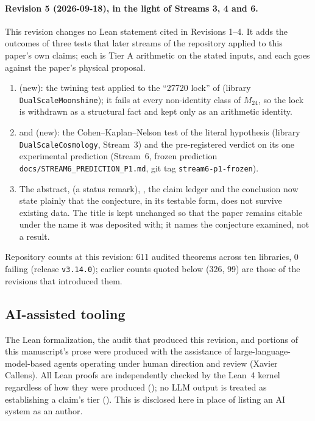 \documentclass[11pt,a4paper]{article}
\theoremstyle{remark}
\begin{document}
\paragraph{Revision 5 (2026-09-18), in the light of Streams 3, 4 and 6.} This revision changes no Lean
statement cited in Revisions 1--4. It adds the outcomes of three tests that later streams of the
repository applied to this paper's own claims; each is Tier A arithmetic on the stated inputs, and
each goes against the paper's physical proposal.
\begin{enumerate}
  \item {} (new): the twining test applied to the ``27720 lock'' of
     (library \texttt{DualScaleMoonshine}); it fails at every non-identity class of
    $M_{24}$, so the lock is withdrawn as a structural fact and kept only as an arithmetic identity.
  \item {} and  (new): the Cohen--Kaplan--Nelson test of the
    literal hypothesis (library \texttt{DualScaleCosmology}, Stream~3) and the pre-registered verdict on
    its one experimental prediction (Stream~6, frozen prediction
    \texttt{docs/\discretionary{}{}{}STREAM6\_\discretionary{}{}{}PREDICTION\_\discretionary{}{}{}P1.md}, git tag
    \texttt{stream6-p1-frozen}).
  \item The abstract,  (a status remark), , the claim ledger
    and the conclusion now state plainly that the conjecture, in its testable form, does not survive
    existing data. The title is kept unchanged so that the paper remains citable under the name it was
    deposited with; it names the conjecture examined, not a result.
\end{enumerate}
Repository counts at this revision: 611 audited theorems across ten libraries, 0 failing (release
\texttt{v3.14.0}); earlier counts quoted below (326, 99) are those of the revisions that introduced them.

\subsection{AI-assisted tooling}
The Lean formalization, the audit that produced this revision, and portions of this manuscript's
prose were produced with the assistance of large-language-model-based agents operating under human
direction and review (Xavier Callens). All Lean proofs are independently checked by the Lean~4
kernel regardless of how they were produced (); no LLM output is treated as
establishing a claim's tier (). This is disclosed here in place of listing an AI
system as an author.
\end{document}
